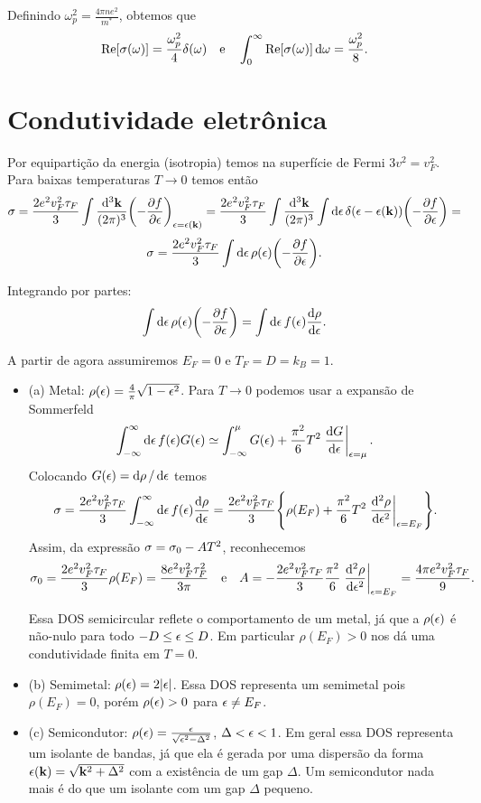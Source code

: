\documentclass[a4paper,10pt]{article}
\begin{document}
Definindo $\omega_p^2 = \frac{4\pi n e^2}{m^*}$, obtemos que
$$
\Re[\sigma(\omega)] = \frac{\omega_p^2}{4} \delta(\omega) \quad \mathrm{e} \quad
\int_0^{\infty} \Re[\sigma(\omega)] \dd{\omega} = \frac{\omega_p^2}{8}.
$$


\pagebreak

\section{Condutividade eletrônica}

Por equipartição da energia (isotropia) temos na superfície de Fermi $3v^2 = v_F^2$. Para baixas temperaturas $T \to 0$ temos então
$$
\sigma = \frac{2e^2 v_F^2 \tau_F}{3} \int \frac{\dd[3]{\vb{k}}}{(2\pi)^3}
\qty(-\pdv{f}{\epsilon})_{\epsilon=\epsilon(\vb{k})} =
\frac{2e^2 v_F^2 \tau_F}{3} \int \frac{\dd[3]{\vb{k}}}{(2\pi)^3}
\int \dd{\epsilon} \delta(\epsilon - \epsilon(\vb{k})) \qty(-\pdv{f}{\epsilon}) =
$$
$$
\sigma = \frac{2e^2 v_F^2 \tau_F}{3} \int \dd{\epsilon} \rho(\epsilon) \qty(-\pdv{f}{\epsilon}).
$$

Integrando por partes:
$$
\int \dd{\epsilon} \rho(\epsilon) \qty(-\pdv{f}{\epsilon}) =
\int \dd{\epsilon} f(\epsilon) \dv{\rho}{\epsilon}.
$$

A partir de agora assumiremos $E_F = 0$ e $T_F = D = k_B = 1$.

\begin{itemize}
\item (a) Metal: $\rho(\epsilon) = \frac{4}{\pi} \sqrt{1-\epsilon^2}$. Para $T \to 0$ podemos usar a expansão de Sommerfeld
$$
\int_{-\infty}^{\infty} \dd{\eps} f(\eps) G(\eps) \simeq
\int_{-\infty}^{\mu} G(\eps) + \frac{\pi^2}{6} T^2 \eval{\dv{G}{\eps}}_{\eps=\mu}.
$$
Colocando $G(\epsilon) = \dd{\rho}/\dd{\epsilon}$ temos
$$
\s = \frac{2e^2 v_F^2 \tau_F}{3}
\int_{-\infty}^{\infty} \dd{\eps} f(\eps) \dv{\rho}{\eps} =
\frac{2e^2 v_F^2 \tau_F}{3}
\qty{\rho(E_F) + \frac{\pi^2}{6} T^2 \eval{\dv[2]{\rho}{\eps}}_{\eps=E_F}}.
$$
Assim, da expressão $\sigma = \sigma_0 - A T^2$, reconhecemos
$$
\s_0 = \frac{2e^2 v_F^2 \tau_F}{3} \rho(E_F) = \frac{8e^2 v_F^2 \tau_F^2}{3\pi} \e
A = -\frac{2e^2v_F^2\tau_F}{3} \frac{\pi^2}{6} \eval{\dv[2]{\rho}{\eps}}_{\eps=E_F}
= \frac{4 \pi e^2v_F^2\tau_F}{9}.
$$

Essa DOS semicircular reflete o comportamento de um metal, já que a $\rho(\epsilon)$ é não-nulo para todo $-D \leq \epsilon \leq D$. Em particular $\rho(E_F) > 0$ nos dá uma condutividade finita em $T = 0$.

\item (b) Semimetal: $\rho(\epsilon)=2\abs{\epsilon}$. Essa DOS representa um semimetal pois $\rho(E_F) = 0$, porém $\rho(\epsilon) > 0$ para $\epsilon \neq E_F$.

\item (c) Semicondutor: $\rho(\epsilon) = \frac{\epsilon}{\sqrt{\epsilon^2-\Delta^2}}$, $\Delta < \epsilon < 1$. Em geral essa DOS representa um isolante de bandas, já que ela é gerada por uma dispersão da forma $\epsilon(\vb{k}) = \sqrt{\vb{k}^2 + \Delta^2}$ com a existência de um gap $\Delta$. Um semicondutor nada mais é do que um isolante com um gap $\Delta$ pequeno.
\end{itemize}
\end{document}
